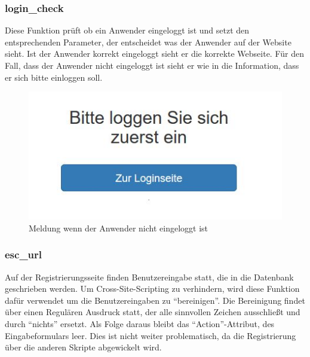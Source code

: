 \subsubsection{login\_check}
Diese Funktion prüft ob ein Anwender eingeloggt ist und setzt den entsprechenden
Parameter, der entscheidet was der Anwender auf der Website sieht. Ist der Anwender korrekt eingeloggt sieht er die korrekte Webseite. Für den Fall, dass der Anwender nicht eingeloggt ist sieht er wie in  die Information, dass er sich bitte einloggen soll.

\begin{figure} [htb]
\begin{centering}
\includegraphics{Bilder/Kapitel4/notloggedin.jpg}
\caption[Meldung wenn der Anwender nicht eingeloggt ist]{Meldung wenn der Anwender nicht eingeloggt ist}
\label{notloggedin}
\end{centering}
\end{figure}


\subsubsection{esc\_url}
Auf der Registrierungsseite finden Benutzereingabe statt, die in die Datenbank geschrieben werden. Um Cross-Site-Scripting zu verhindern, wird diese Funktion dafür verwendet um die Benutzereingaben zu "`bereinigen"'. Die Bereinigung findet über einen Regulären Ausdruck statt, der alle sinnvollen Zeichen ausschließt und durch "`nichts"' ersetzt. Als Folge daraus bleibt das "`Action"'-Attribut, des Eingabeformulars leer. Dies ist nicht weiter problematisch, da die Registrierung über die anderen Skripte abgewickelt wird.

